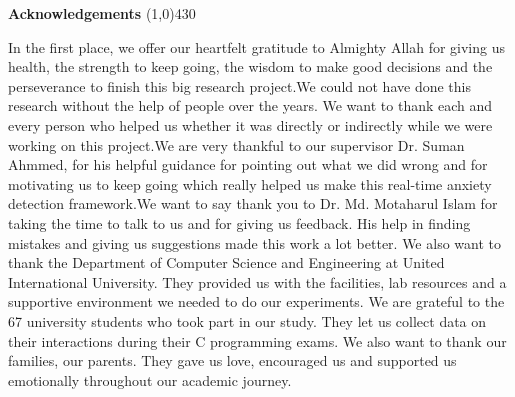 \begin{center}
{\huge \bf Acknowledgements}
\line(1,0){430}
\end{center}

\noindent In the first place, we offer our heartfelt gratitude to Almighty Allah for giving us health, the strength to keep going, the wisdom to make good decisions and the perseverance to finish this big research project.We could not have done this research without the help of people over the years. We want to thank each and every person who helped us whether it was directly or indirectly while we were working on this project.We are very thankful to our supervisor Dr. Suman Ahmmed, for his helpful guidance for pointing out what we did wrong and for motivating us to keep going which really helped us make this real-time anxiety detection framework.We want to say thank you to Dr. Md. Motaharul Islam for taking the time to talk to us and for giving us feedback. His help in finding mistakes and giving us suggestions made this work a lot better.
We also want to thank the Department of Computer Science and Engineering at United International University. They provided us with the facilities, lab resources and a supportive environment we needed to do our experiments. We are grateful to the 67 university students who took part in our study. They let us collect data on their interactions during their C programming exams. We also want to thank our families, our parents. They gave us love, encouraged us and supported us emotionally throughout our academic journey.